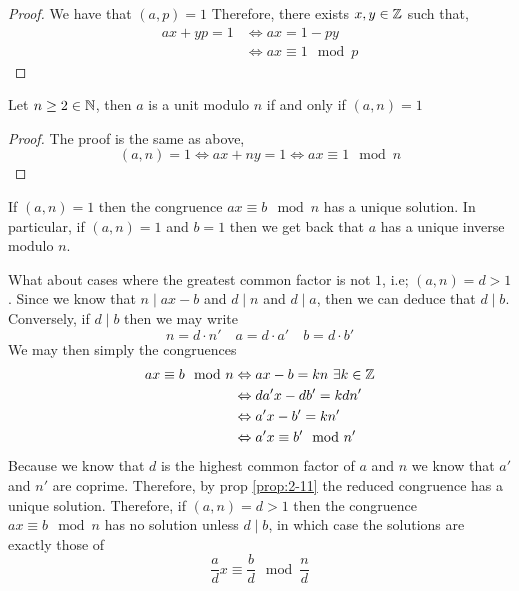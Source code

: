 \documentclass{article}
\begin{document}
\begin{proof}
    We have that $(a, p) = 1$ Therefore, there exists $x, y \in \mathbb{Z}$ such that,
    \begin{align*}
        ax + yp = 1 &\Leftrightarrow ax = 1 - py \\
        &\Leftrightarrow ax \equiv 1 \mod p
    \end{align*}
\end{proof}

\begin{prop}
    Let $n \geq 2 \in \mathbb{N}$, then $a$ is a unit modulo $n$ if and only if $(a, n) = 1$    
\end{prop}

\begin{proof}
    The proof is the same as above,
    \[
        (a, n) = 1 \Leftrightarrow ax + ny = 1 \Leftrightarrow ax \equiv 1 \mod n
    \]
\end{proof}

\begin{ncor}\label{prop:2-11}
    If $(a, n) = 1$ then the congruence $ax \equiv b \mod n$ has a unique solution. In particular, if $(a, n) = 1$ and $b = 1$ then we get back that $a$ has a unique inverse modulo $n$. 
\end{ncor}

What about cases where the greatest common factor is not $1$, i.e; $(a, n) = d > 1$. Since we know that
$n \mid ax - b$ and $d \mid n$ and $d \mid a$, then we can deduce that $d \mid b$. Conversely, if $d \mid b$ then we may write
\[
    n = d \cdot n' \quad  a = d \cdot a' \quad  b = d \cdot b'
\]
We may then simply the congruences
\begin{align*}
    ax \equiv b \mod n &\Leftrightarrow ax - b = kn \ \exists k \in \mathbb{Z} \\
    &\Leftrightarrow da'x - db' = kdn' \\
    &\Leftrightarrow a'x - b' = kn' \\
    &\Leftrightarrow a'x \equiv b' \mod n' 
\end{align*}
Because we know that $d$ is the highest common factor of $a$ and $n$ we know that $a'$ and $n'$ are coprime. Therefore, by prop \ref{prop:2-11} the reduced congruence has a unique solution.
Therefore, if $(a,n)=d>1$ then the congruence $ax \equiv b \mod n$ has no solution unless $d \mid b$, in which case the solutions are exactly those of
\[
    \frac{a}{d}x \equiv \frac{b}{d} \mod \frac{n}{d}  
\]
\end{document}
